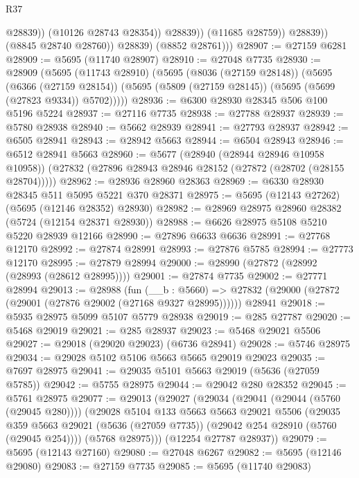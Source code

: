 \begin{lexlean}{R37}
\begin{coremodule}
                            @28839))
                        (@10126 @28743 @28354))
                      @28839))
                  (@11685 @28759))
                @28839))
            (@8845 @28740 @28760))
          @28839)
        (@8852 @28761)))
@28907 := @27159 @6281
@28909 := @5695 (@11740 @28907)
@28910 := @27048 @7735
@28930 := @28909
    (@5695
      (@11743 @28910)
      (@5695
        (@8036 (@27159 @28148))
        (@5695
          (@6366 (@27159 @28154))
          (@5695 (@5809 (@27159 @28145)) (@5695 (@5699 (@27823 @9334)) @5702)))))
@28936 := @6300 @28930 @28345 @506 @100 @5196 @5224
@28937 := @27116 @7735
@28938 := @27788 @28937
@28939 := @5780 @28938
@28940 := @5662 @28939
@28941 := @27793 @28937
@28942 := @6505 @28941
@28943 := @28942 @5663
@28944 := @6504 @28943
@28946 := @6512 @28941 @5663
@28960 := @5677
    (@28940 (@28944 @28946 @10958 @10958))
    (@27832 (@27896 @28943 @28946 @28152 (@27872 (@28702 (@28155 @28704)))))
@28962 := @28936 @28960 @28363
@28969 := @6330 @28930 @28345 @511 @5095 @5221 @370 @28371
@28975 := @5695 (@12143 @27262) (@5695 (@12146 @28352) @28930)
@28982 := @28969 @28975 @28960 @28382 (@5724 (@12154 @28371 @28930))
@28988 := @6626 @28975 @5108 @5210 @5220 @28939 @12166
@28990 := @27896 @6633 @6636
@28991 := @27768 @12170
@28992 := @27874 @28991
@28993 := @27876 @5785
@28994 := @27773 @12170
@28995 := @27879 @28994
@29000 := @28990 (@27872 (@28992 (@28993 (@28612 @28995))))
@29001 := @27874 @7735
@29002 := @27771 @28994
@29013 := @28988
    (fun (__b : @5660) => @27832 (@29000 (@27872 (@29001 (@27876 @29002 (@27168 @9327 @28995))))))
    @28941
@29018 := @5935 @28975 @5099 @5107 @5779 @28938
@29019 := @285 @27787
@29020 := @5468 @29019
@29021 := @285 @28937
@29023 := @5468 @29021 @5506
@29027 := @29018 (@29020 @29023) (@6736 @28941)
@29028 := @5746 @28975
@29034 := @29028 @5102 @5106 @5663 @5665 @29019 @29023
@29035 := @7697 @28975
@29041 := @29035 @5101 @5663 @29019 (@5636 (@27059 @5785))
@29042 := @5755 @28975
@29044 := @29042 @280 @28352
@29045 := @5761 @28975
@29077 := @29013
    (@29027
      (@29034
        (@29041 (@29044 (@5760 (@29045 @280))))
        (@29028
          @5104
          @133
          @5663
          @5663
          @29021
          @5506
          (@29035
            @359
            @5663
            @29021
            (@5636 (@27059 @7735))
            (@29042 @254 @28910 (@5760 (@29045 @254))))
          (@5768 @28975)))
      (@12254 @27787 @28937))
@29079 := @5695 (@12143 @27160)
@29080 := @27048 @6267
@29082 := @5695 (@12146 @29080)
@29083 := @27159 @7735
@29085 := @5695 (@11740 @29083)

\end{coremodule}
\end{lexlean}
